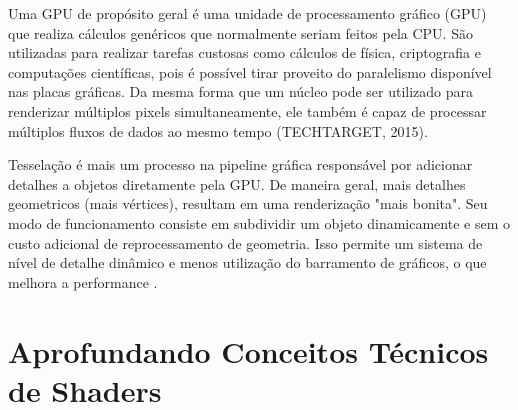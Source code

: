 Uma GPU de propósito geral é uma unidade de processamento gráfico (GPU) que realiza cálculos genéricos que normalmente seriam feitos pela CPU. São utilizadas para realizar tarefas custosas como cálculos de física, criptografia e computações científicas, pois é possível tirar proveito do paralelismo disponível nas placas gráficas. Da mesma forma que um núcleo pode ser utilizado para renderizar múltiplos pixels simultaneamente, ele também é capaz de processar múltiplos fluxos de dados ao mesmo tempo (TECHTARGET, 2015)\nocite{GPGPU}.

Tesselação é mais um processo na pipeline gráfica responsável por adicionar detalhes a objetos diretamente pela GPU. De maneira geral, mais detalhes geometricos (mais vértices), resultam em uma renderização "mais bonita". Seu modo de funcionamento consiste em subdividir um objeto dinamicamente e sem o custo adicional de reprocessamento de geometria. Isso permite um sistema de nível de detalhe dinâmico e menos utilização do barramento de gráficos, o que melhora a performance \cite{HLSLBook}.

	\begin{figure}[h!]
		\centering
	\end{figure}
	\nocite{tesselation}

\section{Aprofundando Conceitos Técnicos de Shaders}
\label{sec:aprofundando-conceitos-tecnicos-shaders}

